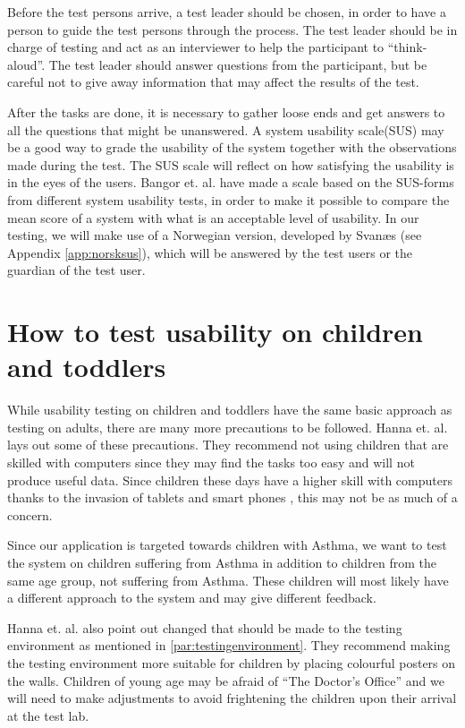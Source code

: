 Before the test persons arrive, a test leader should be chosen, in order to have a person to guide the test persons through the process. The test leader should be in charge of testing and act as an interviewer to help the participant to ``think-aloud''\cite{lewis1982using}. The test leader should answer questions from the participant, but be careful not to give away information that may affect the results of the test.

After the tasks are done, it is necessary to gather loose ends and get answers to all the questions that might be unanswered. A system usability scale(SUS)\cite{sus} may be a good way to grade the usability of the system together with the observations made during the test. The SUS scale will reflect on how satisfying the usability is in the eyes of the users. Bangor et. al. \cite{susform} have made a scale based on the SUS-forms from different system usability tests, in order to make it possible to compare the mean score of a system with what is an acceptable level of usability. In our testing, we will make use of a Norwegian version, developed by Svan\ae s (see Appendix \ref{app:norsksus}), which will be answered by the test users or the guardian of the test user.

\section{How to test usability on children and toddlers}
\label{sec:usabilitytestchildren}
While usability testing on children and toddlers have the same basic approach as testing on adults, there are many more precautions to be followed. 
Hanna et. al. \cite{testingenvironmentforchildren} lays out some of these precautions. They recommend not using children that are skilled with computers since they may find the tasks too easy and will not produce useful data. 
Since children these days have a higher skill with computers thanks to the invasion of tablets and smart phones \cite{babiesusageoftablets}, this may not be as much of a concern. 

Since our application is targeted towards children with Asthma, we want to test the system on children suffering from Asthma in addition to children from the same age group, not suffering from Asthma. These children will most likely have a different approach to the system and may give different feedback.

Hanna et. al. also point out changed that should be made to the testing environment as mentioned in \ref{par:testingenvironment}. They recommend making the testing environment more suitable for children by placing colourful posters on the walls.
Children of young age may be afraid of ``The Doctor's Office'' and we will need to make adjustments to avoid frightening the children upon their arrival at the test lab. 

